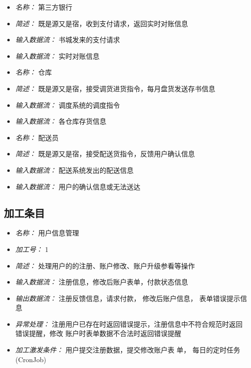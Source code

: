 \vspace{-1mm}


\begin{itemize}
\item \textit{名称： } 第三方银行
\item \textit{简述： } 既是源又是宿，收到支付请求，返回实时对账信息
\item \textit{输入数据流： } 书城发来的支付请求 
\item \textit{输入数据流： } 实时对账信息

\end{itemize}


\vspace{-1mm}


\begin{itemize}
\item \textit{名称： } 仓库
\item \textit{简述： } 既是源又是宿，接受调货进货指令，每月盘货发送存书信息 
\item \textit{输入数据流： } 调度系统的调度指令
\item \textit{输入数据流： } 各仓库存货信息

\end{itemize}


\vspace{-1mm}


\begin{itemize}
\item \textit{名称： } 配送员
\item \textit{简述： } 既是源又是宿，接受配送货指令，反馈用户确认信息 
\item \textit{输入数据流： } 配送系统发出的配送信息
\item \textit{输入数据流： } 用户的确认信息或无法送达

\end{itemize}


\vspace{-1mm}

\subsection{加工条目}
\begin{itemize}
\item \textit{名称： }用户信息管理
\item \textit{加工号： }1
\item \textit{简述： }处理用户的的注册、账户修改、账户升级参看等操作
\item \textit{输入数据流： } 注册信息，修改后账户表单，付款状态信息
\item \textit{输出数据流： } 注册反馈信息，请求付款， 修改后账户信息， 表单错误提示信息 
\item \textit{异常处理： } 注册用户已存在时返回错误提示，注册信息中不符合规范时返回错误提醒，修改 账户时表单数据不合法时返回错误提醒 
\item \textit{加工激发条件： }用户提交注册数据，提交修改账户表 单， 每日的定时任务(CronJob)

\end{itemize}


